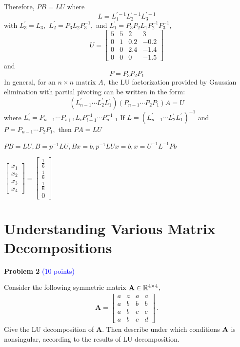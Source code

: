 \documentclass[english,onecolumn]{IEEEtran}
\begin{document}
\begin{enumerate}
\begin{enumerate}
		  Therefore, $P B=L U$ where
		  $$
		  L=L_{1}^{\prime-1} L_{2}^{\prime-1}L_{3}^{\prime-1}
		  $$
		  with $L_{3}^{\prime}= L_{3} ,$ $L_{2}^{\prime}=P_{3} L_{2} P_{3}^{-1},$ and $L_{1}^{\prime}=P_{3} P_{2}L_{1}P_2^{-1} P_{3}^{-1},$
		  $$
		  U=\begin{bmatrix}
		  	5 & 5 & 2 & 3\\
		  	0 & 1 & 0.2 & -0.2\\
		  	0 & 0 & 2.4 & -1.4\\
		  	0 & 0 & 0 & -1.5
		  \end{bmatrix}
		  $$
		  and
		  $$
		  P=P_{3}P_{2} P_{1}
		  $$
		  In general, for an $n \times n$ matrix $A,$ the LU factorization provided by Gaussian elimination
		  with partial pivoting can be written in the form:
		  $$
		  \left(L_{n-1}^{\prime} \cdots L_{2}^{\prime} L_{1}^{\prime}\right)\left(P_{n-1} \cdots P_{2} P_{1}\right) A=U
		  $$
		  where $L_{i}^{\prime}=P_{n-1} \cdots P_{i+1} L_{i} P_{i+1}^{-1} \cdots P_{n-1}^{-1}$
		  If $L=\left(L_{n-1}^{\prime} \cdots L_{2}^{\prime} L_{1}^{\prime}\right)^{-1}$ and $P=P_{n-1} \cdots P_{2} P_{1},$ then $P A=L U$
		  
		  $
		  PB = LU, B = p^{-1}LU, Bx = b,p^{-1}LUx = b, x = U^{-1}L^{-1}Pb
		  $
		  
		  $
		  \left[\begin{array}{c}
		  	x_1\\
		  	x_2\\
		  	x_3\\
		  	x_4 
		  \end{array}\right] = \left[\begin{array}{c}
		  	\frac{1}{6}\\
		  	\frac{1}{6}\\
		  	\frac{1}{6}\\
		  	0
		  \end{array}\right]
		  $
	 \end{enumerate}
	


\end{enumerate}


\newpage
\section{Understanding Various Matrix Decompositions}
\noindent\textbf{Problem 2} \textcolor{blue}{(10 points)}

\noindent Consider the following symmetric matrix ${\bf A}\in \mathbb{R}^{4\times 4}$,
	\begin{align*}
		\mathbf{A}=
		\begin{bmatrix}
			a&a&a&a\\
			a&b&b&b\\
			a&b&c&c\\
			a&b&c&d
		\end{bmatrix}\,.
	\end{align*}
Give the LU decomposition of $\mathbf{A}$.
Then describe under which conditions $\bf{A}$ is nonsingular, according to the results of LU decomposition.
\end{document}
